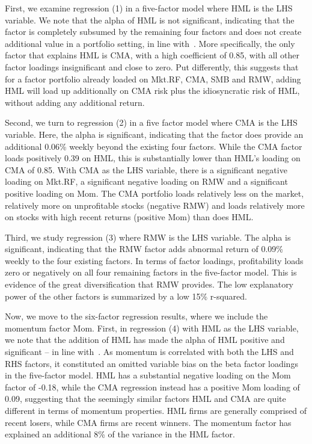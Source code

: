 First, we examine regression (1) in a five-factor model where HML is the LHS variable. We note that the alpha of HML is not significant, indicating that the factor is completely subsumed by the remaining four factors and does not create additional value in a portfolio setting, in line with~\textcite{FF2015}. More specifically, the only factor that explains HML is CMA, with a high coefficient of 0.85, with all other factor loadings insignificant and close to zero. Put differently, this suggests that for a factor portfolio already loaded on Mkt.RF, CMA, SMB and RMW, adding HML will load up additionally on CMA risk plus the idiosyncratic risk of HML, without adding any additional return.

Second, we turn to regression (2) in a five factor model where CMA is the LHS variable. Here, the alpha is significant, indicating that the factor does provide an additional 0.06\% weekly beyond the existing four factors. While the CMA factor loads positively 0.39 on HML, this is substantially lower than HML's loading on CMA of 0.85. With CMA as the LHS variable, there is a significant negative loading on Mkt.RF, a significant negative loading on RMW and a significant positive loading on Mom. The CMA portfolio loads relatively less on the market, relatively more on unprofitable stocks (negative RMW) and loads relatively more on stocks with high recent returns (positive Mom) than does HML.

Third, we study regression (3) where RMW is the LHS variable. The alpha is significant, indicating that the RMW factor adds abnormal return of 0.09\% weekly to the four existing factors. In terms of factor loadings, profitability loads zero or negatively on all four remaining factors in the five-factor model. This is evidence of the great diversification that RMW provides. The low explanatory power of the other factors is summarized by a low 15\% r-squared.



Now, we move to the six-factor regression results, where we include the momentum factor Mom. First, in regression (4) with HML as the LHS variable, we note that the addition of HML has made the alpha of HML positive and significant -- in line with~\textcite{Asness2015}. As momentum is correlated with both the LHS and RHS factors, it constituted an omitted variable bias on the beta factor loadings in the five-factor model. HML has a substantial negative loading on the Mom factor of -0.18, while the CMA regression instead has a positive Mom loading of 0.09, suggesting that the seemingly similar factors HML and CMA are quite different in terms of momentum properties. HML firms are generally comprised of recent losers, while CMA firms are recent winners. The momentum factor has explained an additional 8\% of the variance in the HML factor.

